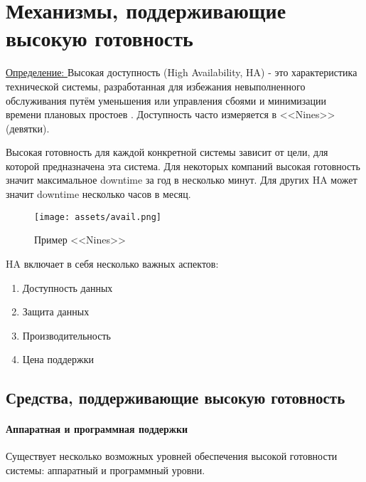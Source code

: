 \section{Механизмы, поддерживающие высокую готовность}

\underline{Определение: } Высокая доступность (High Availability, HA) - это характеристика технической системы, разработанная для избежания невыполненного обслуживания путём уменьшения или управления сбоями и минимизации времени плановых простоев \autocite{WikiHA}. Доступность часто измеряется в <<Nines>> (девятки).

Высокая готовность для каждой конкретной системы зависит от цели, для которой предназначена эта система. Для некоторых компаний высокая готовность значит максимальное downtime за год в несколько минут. Для других HA может значит downtime несколько часов в месяц.
\begin{figure}[h]
    \centering
    \texttt{[image: assets/avail.png]}
    \caption{Пример <<Nines>>}
    \label{fig:mesh1}
\end{figure}

HA включает в себя несколько важных аспектов:
\begin{enumerate}
    \item Доступность данных
    \item Защита данных
    \item Производительность
    \item Цена поддержки
\end{enumerate}

\subsection{Средства, поддерживающие высокую готовность}
\paragraph{Аппаратная и программная поддержки}
Существует несколько возможных уровней обеспечения высокой готовности системы: аппаратный и программный уровни. \\
